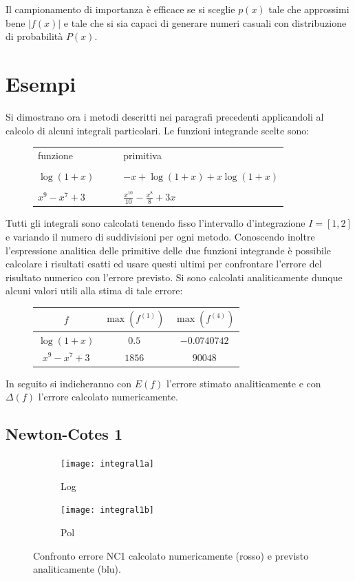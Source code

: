 Il campionamento di importanza è efficace se si sceglie $p(x)$ tale che approssimi bene $|f(x)|$ e tale che si sia capaci di generare numeri casuali con distribuzione di probabilità $P(x)$.

\section{Esempi}
Si dimostrano ora i metodi descritti nei paragrafi precedenti applicandoli al calcolo di alcuni integrali particolari. Le funzioni integrande scelte sono:
\begin{figure}[H]
\centering
\begin{tabular}{lccl}
funzione & & & primitiva\\\\
$\log(1+x)$ & & & $-x + \log(1 + x) + x \log(1 + x)$\\\\
$x^9 - x^7 + 3$ & & & $\frac{x^{10}}{10} - \frac{x^8}{8} + 3x$
\end{tabular}
\end{figure}
Tutti gli integrali sono calcolati tenendo fisso l'intervallo d'integrazione $I=[1,2]$ e variando il numero di suddivisioni per ogni metodo. Conoscendo inoltre l'espressione analitica delle primitive delle due funzioni integrande è possibile calcolare i risultati esatti ed usare questi ultimi per confrontare l'errore del risultato numerico con l'errore previsto. Si sono calcolati analiticamente dunque alcuni valori utili alla stima di tale errore:
\\

\begin{figure}[H]
\centering
\begin{tabular}{ccc}
$f$ & $\max(f^{(1)})$ & $\max(f^{(4)})$\\
\hline
$\log(1+x)$ & $0.5$ & $-0.0740742$\\
$x^9 - x^7 + 3$ & $1856$ & $90048$
\end{tabular}
\end{figure}

In seguito si indicheranno con $E(f)$ l'errore stimato analiticamente e con $\Delta(f)$ l'errore calcolato numericamente.

\subsection{Newton-Cotes 1}

\begin{figure}[H]
 \begin{subfigure}[b]{0.5\textwidth}
  \centering
  \texttt{[image: integral1a]}
  \caption{Log}
 \end{subfigure}
 \begin{subfigure}[b]{0.5\textwidth}
  \centering
  \texttt{[image: integral1b]}
  \caption{Pol}
 \end{subfigure}
\caption{Confronto errore NC1 calcolato numericamente (rosso) e previsto analiticamente (blu).}
\label{fig:integral1}
\end{figure}

